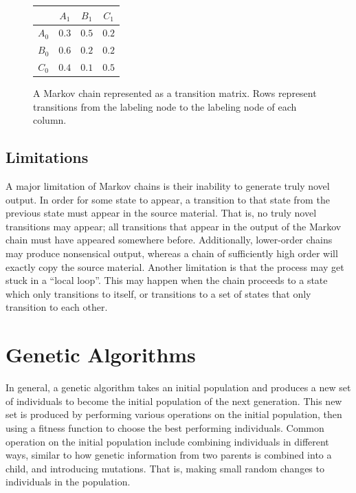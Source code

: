 \begin{figure}[h]
	\centering
	\begin{tabular}{c | c c c}
		& $A_{1}$ & $B_{1}$ & $C_{1}$\\
		\hline
		$A_{0}$ & $0.3$ & $0.5$ & $0.2$\\
		$B_{0}$ & $0.6$ & $0.2$ & $0.2$\\
		$C_{0}$ & $0.4$ & $0.1$ & $0.5$
	\end{tabular}
	\caption[A Markov chain represented as a transition matrix.]{A Markov chain represented as a transition matrix. Rows represent transitions from the labeling node to the labeling node of each column.}
	\label{fig:markovMatrix}
\end{figure}

\subsection{Limitations} \label{bg:markov:limitations}

A major limitation of Markov chains is their inability to generate truly novel output.
In order for some state to appear, a transition to that state from the previous state must appear in the source material.
That is, no truly novel transitions may appear; all transitions that appear in the output of the Markov chain must have appeared somewhere before.
Additionally, lower-order chains may produce nonsensical output, whereas a chain of sufficiently high order will exactly copy the source material.
Another limitation is that the process may get stuck in a ``local loop''.
This may happen when the chain proceeds to a state which only transitions to itself, or transitions to a set of states that only transition to each other.



\section{Genetic Algorithms} \label{bg:ga}

In general, a genetic algorithm takes an initial population and produces a new set of individuals to become the initial population of the next generation.
This new set is produced by performing various operations on the initial population, then using a fitness function to choose the best performing individuals.
Common operation on the initial population include combining individuals in different ways, similar to how genetic information from two parents is combined into a child, and introducing mutations. %
That is, making small random changes to individuals in the population.

